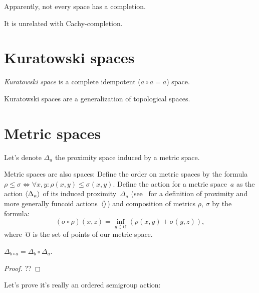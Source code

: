 \begin{note}
Apparently, not every space has a completion.
\end{note}

\begin{note}
It is unrelated with Cachy-completion.
\end{note}

\section{Kuratowski spaces}

\begin{defn}
\emph{Kuratowski space} is a complete idempotent ($a\circ a=a$) space.
\end{defn}

Kuratowski spaces are a generalization of topological spaces.

\section{Metric spaces}

Let's denote $\Delta_a$ the proximity space induced by a metric space.

Metric spaces are also spaces: Define the order on metric spaces by the formula $\rho\leq\sigma \Leftrightarrow \forall x,y:\rho(x,y)\leq\sigma(x,y)$. Define the action for a metric space~$a$ as the action $\left\langle \Delta_a\right\rangle$ of its induced proximity~$\Delta_a$ (see~\cite{volume-1} for a definition of proximity and more generally funcoid actions~$\left\langle \right\rangle$) and composition of metrics $\rho$, $\sigma$ by the formula: \[ (\sigma\circ\rho)(x,z) = \inf_{y\in\mho}(\rho(x,y)+\sigma(y,z)), \]
where~$\mho$ is the set of points of our metric space.

\begin{lem}
$\Delta_{b\circ a} = \Delta_b\circ\Delta_a$.
\end{lem}

\begin{proof}
??
\end{proof}

Let's prove it's really an ordered semigroup action:

